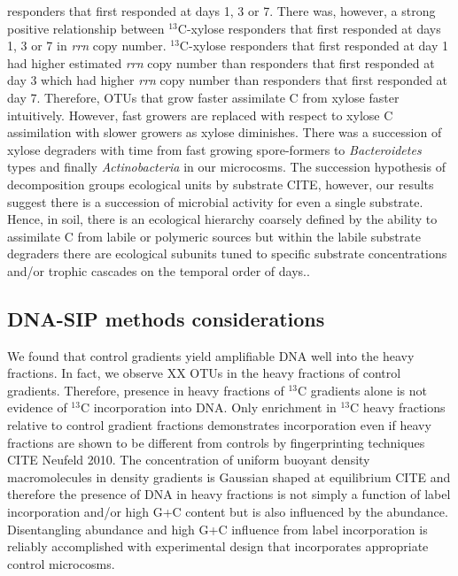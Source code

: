 responders that first responded at days 1, 3 or 7. There was, however, a strong
positive relationship between $^{13}$C-xylose responders that first responded
at days 1, 3 or 7 in \textit{rrn} copy number. $^{13}$C-xylose responders that
first responded at day 1 had higher estimated \textit{rrn} copy number than
responders that first responded at day 3 which had higher \textit{rrn} copy
number than responders that first responded at day 7.  Therefore, OTUs that
grow faster assimilate C from xylose faster intuitively.  However, fast growers
are replaced with respect to xylose C assimilation with slower growers as
xylose diminishes. There was a succession of xylose degraders with time from
fast growing spore-formers to \textit{Bacteroidetes} types and finally
\textit{Actinobacteria} in our microcosms. The succession hypothesis of
decomposition groups ecological units by substrate CITE, however, our results
suggest there is a succession of microbial activity for even a single
substrate. Hence, in soil, there is an ecological hierarchy coarsely defined by
the ability to assimilate C from labile or polymeric sources but within the
labile substrate degraders there are ecological subunits tuned to specific
substrate concentrations and/or trophic cascades on the temporal order of
days..

\subsection{DNA-SIP methods considerations}
We found that control gradients yield amplifiable DNA well into the heavy
fractions. In fact, we observe XX OTUs in the heavy fractions of control
gradients. Therefore, presence in heavy fractions of $^{13}$C gradients alone
is not evidence of $^{13}$C incorporation into DNA. Only enrichment in
$^{13}$C heavy fractions relative to control gradient fractions demonstrates
incorporation even if heavy fractions are shown to be different from controls
by fingerprinting techniques CITE Neufeld 2010. The concentration of uniform
buoyant density macromolecules in density gradients is Gaussian shaped at
equilibrium CITE and therefore the presence of DNA in heavy fractions is not
simply a function of label incorporation and/or high G+C content but is also
influenced by the abundance. Disentangling abundance and high G+C influence
from label incorporation is reliably accomplished with experimental design that
incorporates appropriate control microcosms.

